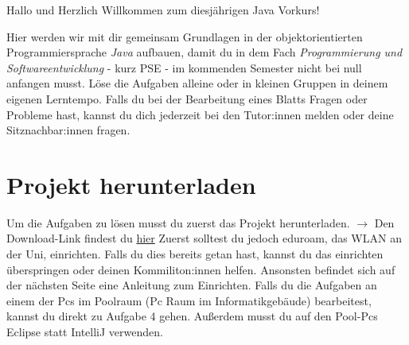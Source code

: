 \begin{center}
	Hallo und Herzlich Willkommen zum diesjährigen Java Vorkurs!\\
\end{center}
Hier werden wir mit dir gemeinsam Grundlagen in der objektorientierten Programmiersprache \textit{Java} aufbauen, damit du in dem Fach \textit{Programmierung und Softwareentwicklung} - kurz PSE - im kommenden Semester nicht bei null anfangen musst.\newline
Löse die Aufgaben alleine oder in kleinen Gruppen in deinem eigenen Lerntempo.\newline
Falls du bei der Bearbeitung eines Blatts Fragen oder Probleme hast, kannst du dich jederzeit bei den Tutor:innen melden oder deine Sitznachbar:innen fragen.\newline

\section*{Projekt herunterladen}
Um die Aufgaben zu lösen musst du zuerst das Projekt herunterladen.\newline
$\rightarrow$ Den Download-Link findest du \href{\jvkpackageurl}{hier}\newline
Zuerst solltest du jedoch eduroam, das WLAN an der Uni, einrichten. 
Falls du dies bereits getan hast, kannst du das einrichten überspringen oder deinen Kommiliton:innen helfen. 
Ansonsten befindet sich auf der nächsten Seite eine Anleitung zum Einrichten.
Falls du die Aufgaben an einem der Pcs im Poolraum (Pc Raum im Informatikgebäude) bearbeitest, kannst du direkt zu Aufgabe 4 gehen. 
Außerdem musst du  auf den Pool-Pcs Eclipse statt IntelliJ verwenden.
\newpage
